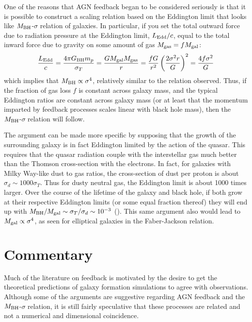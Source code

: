 One of the reasons that AGN feedback began to be considered seriously
is that it is possible to construct a scaling relation based on the
Eddington limit that looks like $M_{\rm BH}$-$\sigma$ relation of
galaxies. In particular, if you set the total outward force due to
radiation pressure at the Eddington limit, $L_{\rm Edd} / c$, equal to
the total inward force due to gravity on some amount of gas $M_{\rm
gas} = f M_{\rm gal}$:
\begin{equation}
\frac{L_{\rm Edd}}{c} = \frac{4\pi G_{\rm BH} m_p}{\sigma_T}
= \frac{GM_{\rm gal}M_{\rm gas}}{r} = \frac{f
G}{r^2} \left(\frac{2\sigma^2 r}{G}\right)^2 = \frac{4f\sigma^2}{G}
\end{equation}
which implies that $M_{\rm BH} \propto \sigma^4$, relatively similar
to the relation observed. Thus, if the fraction of gas loss $f$ is
constant across galaxy mass, and the typical Eddington ratios are
constant across galaxy mass (or at least that the momentum imparted by
feedback processes scales linear with black hole mass), then the
$M_{\rm BH}$-$\sigma$ relation will follow.

The argument can be made more specific by supposing that the growth of
the surrounding galaxy is in fact Eddington limited by the action of
the quasar. This requires that the quasar radiation couple with the
interstellar gas much better than the Thomson cross-section with the
electrons. In fact, for galaxies with Milky Way-like dust to gas
ratios, the cross-section of dust per proton is about $\sigma_d \sim
1000 \sigma_T$. Thus for dusty neutral gas, the Eddington limit is
about 1000 times larger. Over the course of the lifetime of the galaxy
and black hole, if both grow at their respective Eddington limits (or
some equal fraction thereof) they will end up with $M_{\rm BH}/M_{\rm
gal} \sim \sigma_T / \sigma_d \sim 10^{-3}$ (\citealt{fabian12a}).
This same argument also would lead to $M_{\rm gal} \propto \sigma^4$,
as seen for elliptical galaxies in the Faber-Jackson
relation. 

\section{Commentary}

Much of the literature on feedback is motivated by the desire to get
the theoretical predictions of galaxy formation simulations to agree
with observations. Although some of the arguments are suggestive
regarding AGN feedback and the $M_{\rm BH}$-$\sigma$ relation, it is
still fairly speculative that these processes are related and not a
numerical and dimensional coincidence.

